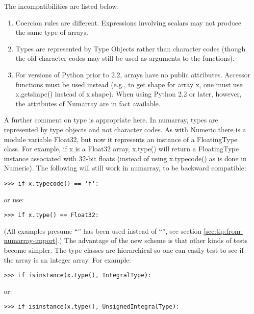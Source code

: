 The incompatibilities are listed below. 
\begin{enumerate}
\item Coercion rules are different. Expressions involving scalars may not
   produce the same type of arrays.  
\item Types are represented by Type Objects rather than character codes (though
   the old character codes may still be used as arguments to the functions).
\item For versions of Python prior to 2.2, arrays have no public attributes.
   Accessor functions must be used instead (e.g., to get shape for array x, one
   must use x.getshape() instead of x.shape). When using Python 2.2 or later,
   however, the attributes of Numarray are in fact available.
\end{enumerate}
A further comment on type is appropriate here. In numarray, types are
represented by type objects and not character codes. As with Numeric there is a
module variable Float32, but now it represents an instance of a FloatingType
class. For example, if x is a Float32 array, x.type() will return a
FloatingType instance associated with 32-bit floats (instead of using
x.typecode() as is done in Numeric). The following will still work in
numarray, to be backward compatible:
\begin{verbatim}
>>> if x.typecode() == 'f':
\end{verbatim}
or use:
\begin{verbatim}
>>> if x.type() == Float32:
\end{verbatim}
(All examples presume ``'' has been used instead
of ``'', see section \ref{sec:tip:from-numarray-import}.)
The advantage of the new scheme is that other kinds of tests become simpler.
The type classes are hierarchical so one can easily test to see if the array is
an integer array. For example:
\begin{verbatim}
>>> if isinstance(x.type(), IntegralType): 
\end{verbatim}
or:
\begin{verbatim}
>>> if isinstance(x.type(), UnsignedIntegralType):
\end{verbatim}



